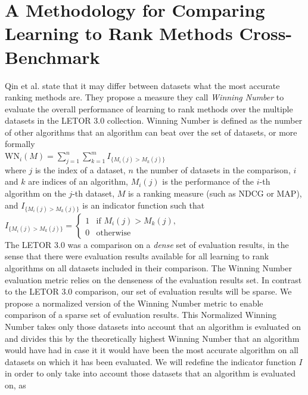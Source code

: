 \documentclass{sig-alternate}
\begin{document}
\section{A Methodology for Comparing Learning to Rank Methods Cross-Benchmark}
Qin et al. \cite{Qin2010} state that it may differ between datasets what the most accurate ranking methods are. They propose a measure they call \emph{Winning Number} to evaluate the overall performance of learning to rank methods over the multiple datasets in the LETOR 3.0 collection. Winning Number is defined as the number of other algorithms that an algorithm can beat over the set of datasets, or more formally\\

$\text{WN}_i(M) = \sum\nolimits_{j=1}^n \sum\nolimits_{k=1}^m I_{\{M_i(j)>M_k(j)\}}$\\

where $j$ is the index of a dataset, $n$ the number of datasets in the comparison, $i$ and $k$ are indices of an algorithm, $M_i(j)$ is the performance of the $i$-th algorithm on the $j$-th dataset, $M$ is a ranking measure (such as NDCG or MAP), and $I_{\{M_i(j)>M_k(j)\}}$ is an indicator function such that\\

$I_{\{M_i(j)>M_k(j)\}} = \begin{cases}
1 & \text{if } M_i(j) > M_k(j), \\
0 & \text{otherwise}
\end{cases}$\\

The LETOR 3.0 was a comparison on a \emph{dense} set of evaluation results, in the sense that there were evaluation results available for all learning to rank algorithms on all datasets included in their comparison. The Winning Number evaluation metric relies on the denseness of the evaluation results set. In contrast to the LETOR 3.0 comparison, our set of evaluation results will be sparse. We propose a normalized version of the Winning Number metric to enable comparison of a sparse set of evaluation results. This Normalized Winning Number takes only those datasets into account that an algorithm is evaluated on and divides this by the theoretically highest Winning Number that an algorithm would have had in case it it would have been the most accurate algorithm on all datasets on which it has been evaluated. We will redefine the indicator function $I$ in order to only take into account those datasets that an algorithm is evaluated on, as
\end{document}
